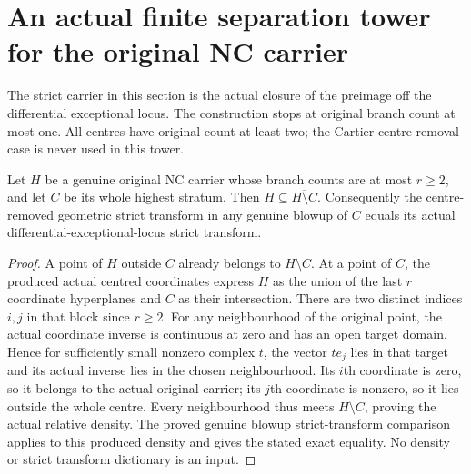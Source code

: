 \section{An actual finite separation tower for the original NC carrier}
\label{sec:hironaka-normal-crossings-boundary-separation}

The strict carrier in this section is the actual closure of the preimage
off the differential exceptional locus. The construction stops at original
branch count at most one. All centres have original count at least two;
the Cartier centre-removal case is never used in this tower.

\begin{lemma}
\label{hir:general-nc-higher-highest-relative-density}
\leanok
{}
Let $H$ be a genuine original NC carrier whose branch counts are at most
$r\ge2$, and let $C$ be its whole highest stratum. Then
$H\subseteq\overline{H\setminus C}$. Consequently the centre-removed
geometric strict transform in any genuine blowup of $C$ equals its
actual differential-exceptional-locus strict transform.
\end{lemma}
\begin{proof}
A point of $H$ outside $C$ already belongs to $H\setminus C$.
At a point of $C$, the produced actual centred coordinates express
$H$ as the union of the last $r$ coordinate hyperplanes and $C$ as
their intersection. There are two distinct indices $i,j$ in that block
since $r\ge2$. For any neighbourhood of the original point, the actual
coordinate inverse is continuous at zero and has an open target domain.
Hence for sufficiently small nonzero complex $t$, the vector $t e_j$
lies in that target and its actual inverse lies in the chosen
neighbourhood. Its $i$th coordinate is zero, so it belongs to the
actual original carrier; its $j$th coordinate is nonzero, so it lies
outside the whole centre. Every neighbourhood thus meets
$H\setminus C$, proving the actual relative density. The proved
genuine blowup strict-transform comparison applies to this produced
density and gives the stated exact equality. No density or strict
transform dictionary is an input.
\end{proof}

